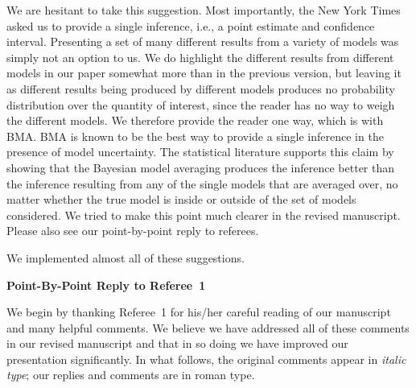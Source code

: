 \documentclass[11pt]{article}
\begin{document}
\begin{enumerate}
  We are hesitant to take this suggestion.  Most importantly, the New
  York Times asked us to provide a single inference, i.e., a point
  estimate and confidence interval. Presenting a set of many different
  results from a variety of models was simply not an option to us.  We
  do highlight the different results from different models in our
  paper somewhat more than in the previous version, but leaving it as
  different results being produced by different models produces no
  probability distribution over the quantity of interest, since the
  reader has no way to weigh the different models.  We therefore
  provide the reader one way, which is with BMA.  BMA is known to be
  the best way to provide a single inference in the presence of model
  uncertainty.  The statistical literature supports this claim by
  showing that the Bayesian model averaging produces the inference
  better than the inference resulting from any of the single models
  that are averaged over, no matter whether the true model is inside
  or outside of the set of models considered.  We tried to make this
  point much clearer in the revised manuscript.  Please also see our
  point-by-point reply to referees.

\end{enumerate}

\bigskip
{}

We implemented almost all of these suggestions.



\clearpage
\begin{center}
  {\bf \Large Point-By-Point Reply to Referee~1}
\end{center}

We begin by thanking Referee~1 for his/her careful reading of our
manuscript and many helpful comments. We believe we have addressed all
of these comments in our revised manuscript and that in so doing we
have improved our presentation significantly.  In what follows, the
original comments appear in \emph{italic type}; our replies and
comments are in roman type.

\bigskip
{}
\end{document}
